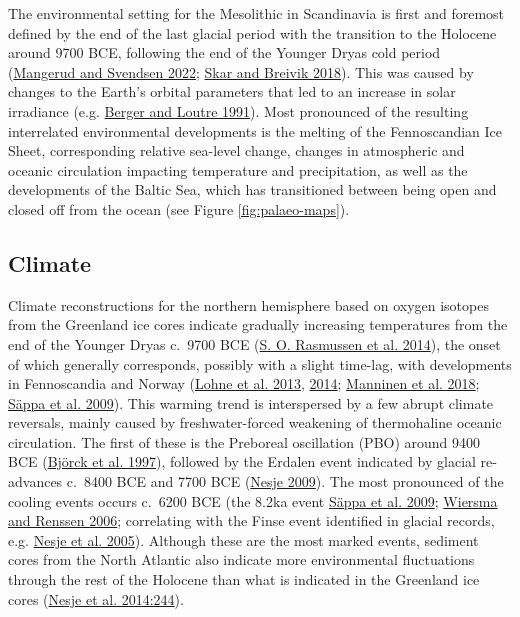 \documentclass[
  12pt,
  a4paper,
  oneside]{book}
\begin{document}
The environmental setting for the Mesolithic in Scandinavia is first and foremost defined by the end of the last glacial period with the transition to the Holocene around 9700 BCE, following the end of the Younger Dryas cold period (\protect\hyperlink{ref-mangerud2022}{Mangerud and Svendsen 2022}; \protect\hyperlink{ref-skar2018}{Skar and Breivik 2018}). This was caused by changes to the Earth's orbital parameters that led to an increase in solar irradiance (e.g. \protect\hyperlink{ref-berger1991}{Berger and Loutre 1991}). Most pronounced of the resulting interrelated environmental developments is the melting of the Fennoscandian Ice Sheet, corresponding relative sea-level change, changes in atmospheric and oceanic circulation impacting temperature and precipitation, as well as the developments of the Baltic Sea, which has transitioned between being open and closed off from the ocean (see Figure \ref{fig:palaeo-maps}).

\hypertarget{climate}{%
\subsection{Climate}\label{climate}}

Climate reconstructions for the northern hemisphere based on oxygen isotopes from the Greenland ice cores indicate gradually increasing temperatures from the end of the Younger Dryas c.~9700 BCE (\protect\hyperlink{ref-rasmussen2014}{S. O. Rasmussen et al. 2014}), the onset of which generally corresponds, possibly with a slight time-lag, with developments in Fennoscandia and Norway (\protect\hyperlink{ref-lohne2013}{Lohne et al. 2013}, \protect\hyperlink{ref-lohne2014}{2014}; \protect\hyperlink{ref-manninen2018}{Manninen et al. 2018}; \protect\hyperlink{ref-seppa2009}{Säppa et al. 2009}). This warming trend is interspersed by a few abrupt climate reversals, mainly caused by freshwater-forced weakening of thermohaline oceanic circulation. The first of these is the Preboreal oscillation (PBO) around 9400 BCE (\protect\hyperlink{ref-bjorck1997}{Björck et al. 1997}), followed by the Erdalen event indicated by glacial re-advances c.~8400 BCE and 7700 BCE (\protect\hyperlink{ref-nesje2009}{Nesje 2009}). The most pronounced of the cooling events occurs c.~6200 BCE (the 8.2ka event \protect\hyperlink{ref-seppa2009}{Säppa et al. 2009}; \protect\hyperlink{ref-wiersma2006}{Wiersma and Renssen 2006}; correlating with the Finse event identified in glacial records, e.g. \protect\hyperlink{ref-nesje2005}{Nesje et al. 2005}). Although these are the most marked events, sediment cores from the North Atlantic also indicate more environmental fluctuations through the rest of the Holocene than what is indicated in the Greenland ice cores (\protect\hyperlink{ref-nesje2014}{Nesje et al. 2014:244}).
\end{document}
